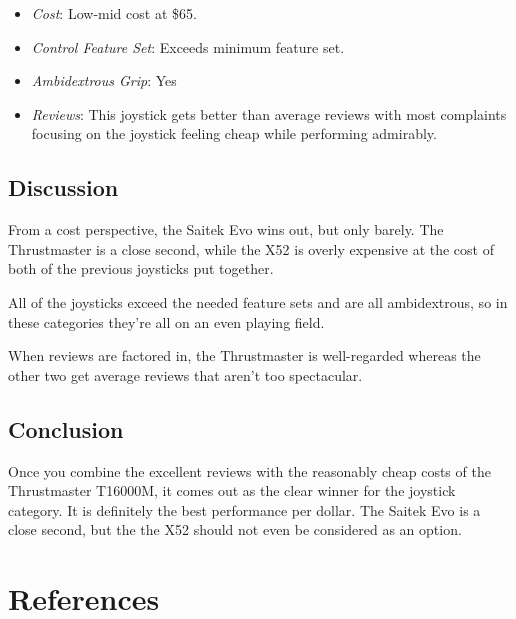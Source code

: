 \documentclass[onecolumn, draftclsnofoot, 10pt, compsoc]{IEEEtran}
\begin{document}
\begin{itemize}
\item \textit{Cost}: Low-mid cost at \$65.
\item \textit{Control Feature Set}: Exceeds minimum feature set.
\item \textit{Ambidextrous Grip}: Yes
\item \textit{Reviews}: This joystick gets better than average reviews with most complaints focusing on the joystick feeling cheap while performing admirably.
\end{itemize}

\subsection{Discussion}
From a cost perspective, the Saitek Evo wins out, but only barely. The Thrustmaster is a close second, while the X52 is overly expensive at the cost of both of the previous joysticks put together. 

All of the joysticks exceed the needed feature sets and are all ambidextrous, so in these categories they're all on an even playing field.

When reviews are factored in, the Thrustmaster is well-regarded whereas the other two get average reviews that aren't too spectacular.

\subsection{Conclusion}
Once you combine the excellent reviews with the reasonably cheap costs of the Thrustmaster T16000M, it comes out as the clear winner for the joystick category. It is definitely the best performance per dollar. The Saitek Evo is a close second, but the the X52 should not even be considered as an option.

\section{References}

\end{document}
